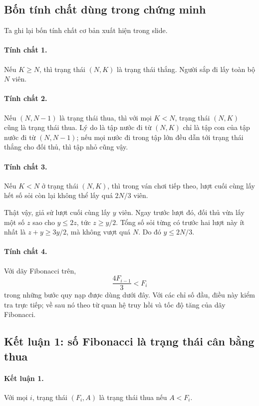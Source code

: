 \documentclass[11pt]{article}
\begin{document}
\subsection{Bốn tính chất dùng trong chứng minh}

Ta ghi lại bốn tính chất cơ bản xuất hiện trong slide.

\paragraph{Tính chất 1.}
Nếu \(K\ge N\), thì trạng thái \((N,K)\) là trạng thái thắng. Người sắp đi
lấy toàn bộ \(N\) viên.

\paragraph{Tính chất 2.}
Nếu \((N,N-1)\) là trạng thái thua, thì với mọi \(K<N\), trạng thái
\((N,K)\) cũng là trạng thái thua. Lý do là tập nước đi từ \((N,K)\) chỉ là
tập con của tập nước đi từ \((N,N-1)\); nếu mọi nước đi trong tập lớn đều dẫn
tới trạng thái thắng cho đối thủ, thì tập nhỏ cũng vậy.

\paragraph{Tính chất 3.}
Nếu \(K<N\) ở trạng thái \((N,K)\), thì trong ván chơi tiếp theo, lượt cuối
cùng lấy hết số sỏi còn lại không thể lấy quá \(2N/3\) viên.

Thật vậy, giả sử lượt cuối cùng lấy \(y\) viên. Ngay trước lượt đó, đối thủ
vừa lấy một số \(z\) sao cho \(y\le 2z\), tức \(z\ge y/2\). Tổng số sỏi từng
có trước hai lượt này ít nhất là \(z+y\ge 3y/2\), mà không vượt quá \(N\).
Do đó \(y\le 2N/3\).

\paragraph{Tính chất 4.}
Với dãy Fibonacci trên,
\[
  \frac{4F_{i-1}}{3}<F_i
\]
trong những bước quy nạp được dùng dưới đây. Với các chỉ số đầu, điều này
kiểm tra trực tiếp; về sau nó theo từ quan hệ truy hồi và tốc độ tăng của
dãy Fibonacci.

\subsection{Kết luận 1: số Fibonacci là trạng thái cân bằng thua}

\paragraph{Kết luận 1.}
Với mọi \(i\), trạng thái \((F_i,A)\) là trạng thái thua nếu \(A<F_i\).
\end{document}
